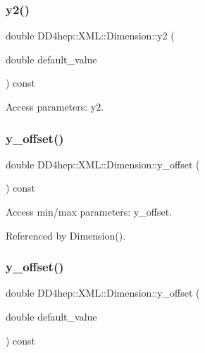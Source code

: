 \subsubsection{\texorpdfstring{y2()}{y2()}\hspace{0.1cm}{\footnotesize\ttfamily [2/2]}}
{\footnotesize\ttfamily double D\+D4hep\+::\+X\+M\+L\+::\+Dimension\+::y2 (\begin{DoxyParamCaption}\item[{double}]{default\+\_\+value }\end{DoxyParamCaption}) const}



Access parameters\+: y2. 

\hypertarget{struct_d_d4hep_1_1_x_m_l_1_1_dimension_ad9ecf376ee7a032ed8dd90e5909a3211}{}\label{struct_d_d4hep_1_1_x_m_l_1_1_dimension_ad9ecf376ee7a032ed8dd90e5909a3211} 
\subsubsection{\texorpdfstring{y\+\_\+offset()}{y\_offset()}\hspace{0.1cm}{\footnotesize\ttfamily [1/2]}}
{\footnotesize\ttfamily double D\+D4hep\+::\+X\+M\+L\+::\+Dimension\+::y\+\_\+offset (\begin{DoxyParamCaption}{ }\end{DoxyParamCaption}) const}



Access min/max parameters\+: y\+\_\+offset. 



Referenced by Dimension().

\hypertarget{struct_d_d4hep_1_1_x_m_l_1_1_dimension_a770c462f706c13e21481db1b4886e236}{}\label{struct_d_d4hep_1_1_x_m_l_1_1_dimension_a770c462f706c13e21481db1b4886e236} 
\subsubsection{\texorpdfstring{y\+\_\+offset()}{y\_offset()}\hspace{0.1cm}{\footnotesize\ttfamily [2/2]}}
{\footnotesize\ttfamily double D\+D4hep\+::\+X\+M\+L\+::\+Dimension\+::y\+\_\+offset (\begin{DoxyParamCaption}\item[{double}]{default\+\_\+value }\end{DoxyParamCaption}) const}



